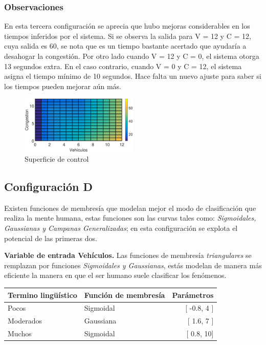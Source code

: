 \subsubsection{Observaciones}
\begin{multicols}{2}

	En esta tercera configuración se aprecia que hubo mejoras considerables en los tiempos inferidos por el sistema. Si se observa la salida para V = 12 y C = 12, cuya salida es 60, se nota que es un tiempo bastante acertado que ayudaría a desahogar la congestión. Por otro lado cuando V = 12 y C = 0, el sistema otorga 13 segundos extra. En el caso contrario, cuando V = 0 y C = 12, el sistema asigna el tiempo mínimo de 10 segundos. Hace falta un nuevo ajuste para saber si los tiempos pueden mejorar aún más.
	
	\begin{figure}[H]
		\includegraphics[width=0.5\textwidth]{Surfaces/Surface2D_C.eps}
		\caption{Superficie de control}
	\end{figure}
\end{multicols}
\pagebreak





\subsection{Configuración D}\label{section:configd}
Existen funciones de membresía que modelan mejor el modo de clasificación que realiza la mente humana, estas funciones son las curvas tales como: \textit{Sigmoidales, Gaussianas y Campanas Generalizadas}; en esta configuración se explota el potencial de las primeras dos.

\textbf{Variable de entrada Vehículos.} Las funciones de membresía \textit{triangulares} se remplazan por funciones \textit{Sigmoidales y Gaussianas}, estás modelan de manera más eficiente la manera en que el ser humano suele clasificar los fenómenos.
\begin{center}
	\begin{tabular}{llr} \toprule
		Termino lingüístico & Función de membresía & Parámetros \\ \midrule
		Pocos & Sigmoidal & [ -0.8, 4 ] \\
		Moderados & Gaussiana & [ 1.6, 7 ] \\
		Muchos & Sigmoidal & [ 0.8, 10] \\ \bottomrule
	\end{tabular}
\end{center}

